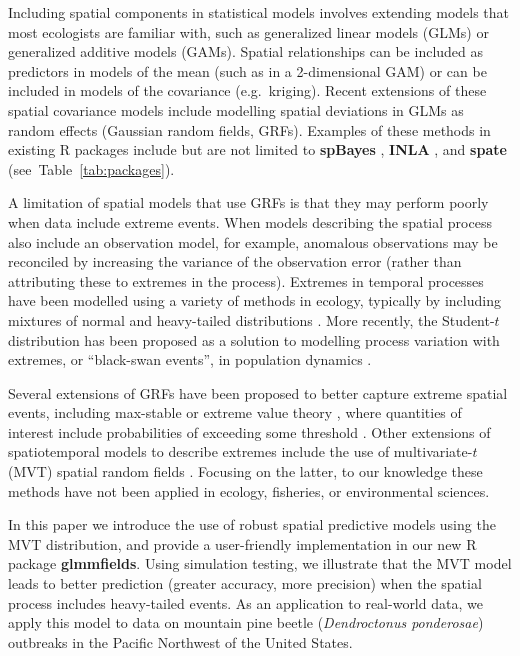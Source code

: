 \documentclass[12pt,english]{article}
\begin{document}
\begin{spacing}{1.8}
Including spatial components in statistical models involves extending models
that most ecologists are familiar with, such as generalized linear
models (GLMs) or generalized additive models (GAMs). Spatial relationships can
be included as predictors in models of the mean (such as in a 2-dimensional GAM)
or can be included in models of the covariance (e.g.\ kriging). Recent
extensions of these spatial covariance models include modelling spatial
deviations in GLMs as random effects (Gaussian random fields, GRFs).
Examples of these methods in existing R packages include but are not limited to
\textbf{spBayes} \citep{finley2007}, \textbf{INLA} \citep{rue2009}, and
\textbf{spate} \citep{sigrist2015} (see~Table~\ref{tab:packages}).

A limitation of spatial models that use GRFs is that they may perform poorly
when data include extreme events. When models describing the spatial process
also include an observation model, for example, anomalous observations may be
reconciled by increasing the variance of the observation error (rather than
attributing these to extremes in the process). Extremes in temporal processes
have been modelled using a variety of methods in ecology, typically by including
mixtures of normal and heavy-tailed distributions \citep[e.g.][]{everitt1996,
  ward2007, thorson2011}. More recently, the Student-$t$ distribution has been
proposed as a solution to modelling process variation with extremes, or
``black-swan events'', in population dynamics \citep{anderson2017}.

Several extensions of GRFs have been proposed to better capture extreme spatial
events, including max-stable or extreme value theory \citep{davison2012,
  davison2012a}, where quantities of interest include probabilities of exceeding
some threshold \citep{davis2008}. Other extensions of spatiotemporal models to
describe extremes include the use of multivariate-$t$ (MVT) spatial random
fields \citep{roislien2007}. Focusing on the latter, to our knowledge these
methods have not been applied in ecology, fisheries, or environmental sciences.

In this paper we introduce the use of robust spatial predictive models using the
MVT distribution, and provide a user-friendly implementation in our new R
package \textbf{glmmfields}. Using simulation testing, we illustrate that the
MVT model leads to better prediction (greater accuracy, more precision) when the
spatial process includes heavy-tailed events. As an application to real-world data, we
apply this model to data on mountain pine beetle (\textit{Dendroctonus
  ponderosae}) outbreaks in the Pacific Northwest of the United States.


\end{spacing}
\end{document}

